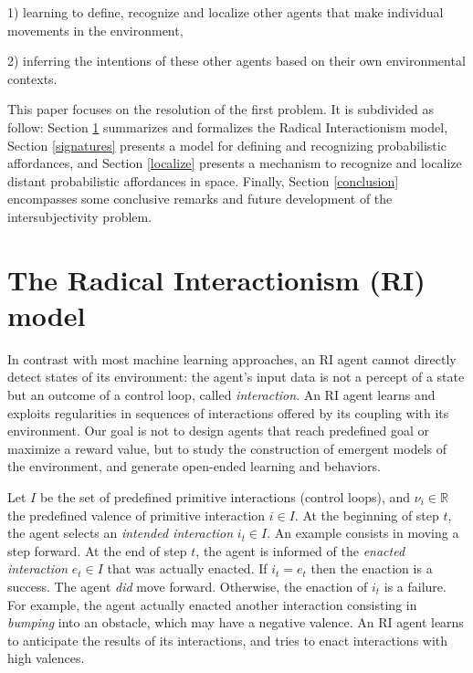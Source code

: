 \documentclass[conference]{IEEEtran}
\begin{document}
1) learning to define, recognize and localize other agents that make individual movements in the environment,

2) inferring the intentions of these other agents based on their own environmental contexts. %

This paper focuses on the resolution of the first problem. 
It is subdivided as follow: Section \ref{RI} summarizes and formalizes the Radical Interactionism model, Section \ref{signatures} presents a model for defining and recognizing probabilistic affordances, and Section \ref{localize} presents a mechanism to recognize and localize distant probabilistic affordances in space. Finally, Section \ref{conclusion} encompasses some conclusive remarks and future development of the intersubjectivity problem.

\section{The Radical Interactionism (RI) model}\label{RI}


In contrast with most machine learning approaches, an RI agent cannot directly detect states of its environment: %
the agent's input data is not a percept of a state but an outcome of a control loop, called \textit{interaction}.
An RI agent learns and exploits regularities in sequences of interactions offered by its coupling with its environment.
Our goal is not to design agents that reach predefined goal or maximize a reward value, but to study the construction of emergent models of the environment, and generate open-ended learning and behaviors.

Let $I$ be the set of predefined primitive interactions (control loops), and $\nu_i \in \mathbb{R}$ the predefined valence of primitive interaction $i \in I$.
At the beginning of step $t$, the agent selects an \textit{intended interaction} $i_t \in I$.
An example consists in moving a step forward. %
At the end of step $t$, the agent is informed of the \textit{enacted interaction} $e_t \in I$ that was actually enacted. 
If $i_t = e_t$ then the enaction is a success. 
The agent \textit{did} move forward.
Otherwise, the enaction of $i_t$ is a failure.
For example, the agent actually enacted another interaction consisting in \textit{bumping} into an obstacle, which may have a negative valence.
An RI agent learns to anticipate the results of its interactions, and tries to enact interactions with high valences.
\end{document}
